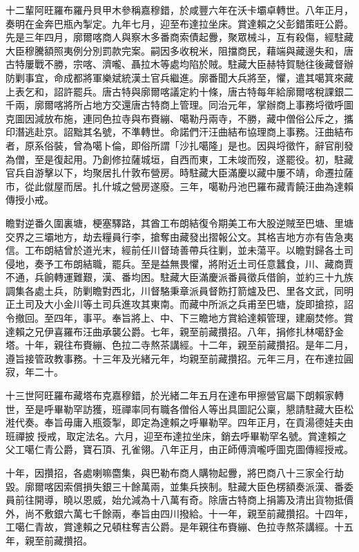 \begin{pinyinscope}
十二輩阿旺羅布羅丹貝甲木參稱嘉穆錯，於咸豐六年在沃卡壩卓轉世。八年正月，奏明在金奔巴瓶內掣定。九年七月，迎至布達拉坐床。賞達賴之父彭錯策旺公爵。先是三年四月，廓爾喀商人與察木多番商索債起釁，聚眾械斗，互有殺傷，經駐藏大臣穆騰額照夷例分別罰款完案。嗣因多收稅米，阻擋商民，藉端與藏邊失和，唐古特屢戰不勝，宗喀、濟嚨、聶拉木等處均陷於賊。駐藏大臣赫特賀馳往後藏督辦防剿事宜，命成都將軍樂斌統漢土官兵繼進。廓番聞大兵將至，懼，遣其噶箕來藏上表乞和，詔許罷兵。唐古特與廓爾喀議定約十條，唐古特每年給廓爾喀稅課銀二千兩，廓爾喀將所占地方交還唐古特商上管理。同治元年，掌辦商上事務埒徵呼圖克圖因減放布施，連同色拉寺與布賚繃、噶勒丹兩寺，不勝，藏中僧俗公斥之，攜印潛逃赴京。詔黜其名號，不準轉世。命諾們汗汪曲結布協理商上事務。汪曲結布者，原系俗裝，曾為噶卜倫，即俗所謂「沙扎噶隆」是也。因與埒徵忤，辭官削發為僧，至是復起用。乃創修拉薩城垣，自西而東，工未竣而歿，遂罷役。初，駐藏官兵自游擊以下，均聚居扎什敦布營房。時駐藏大臣滿慶以藏中屢不靖，命遷拉薩市，從此僦屋而居。扎什城之營房遂廢。三年，噶勒丹池巴羅布藏青饒汪曲為達賴傳授小戒。

瞻對逆番久圍裏塘，梗塞驛路，其酋工布朗結復令期美工布大股逆賊至巴塘、里塘交界之三壩地方，劫去糧員行李，搶奪由藏發出摺報公文。其格吉地方亦有告急夷信。工布朗結曾於道光末，經前任川督琦善帶兵往剿，並未蕩平。以瞻對歸各土司侵地，奏予工布朗結職，罷兵。至是益無畏懼，將附近土司任意蠶食，川、藏商賈不通，兵餉轉運難艱，漢、番均困。駐藏大臣滿慶派番員徵兵借餉，並約三十九族調集各處土兵，防剿瞻對西北，川督駱秉章派員督飭打箭爐及巴、里各文武，同明正土司及大小金川等土司兵進攻其東南。而藏中所派之兵甫至巴塘，旋即搶掠，詔令撤回。至四年，事平。奉旨將上、中、下三瞻地方賞給達賴管理，建廟焚修。賞達賴之兄伊喜羅布汪曲承襲公爵。七年，親至前藏攢招。八年，捐修扎林噶舒金塔。十年，親往布賚繃、色拉二寺熬茶講經。十二年，親至前藏攢招。是年二月，遵旨接管政教事務。十三年及光緒元年，均親至前藏攢招。元年三月，在布達拉圓寂，年二十。

十三世阿旺羅布藏塔布克嘉穆錯，於光緒二年五月在達布甲擦營官屬下朗賴家轉世，至是呼畢勒罕訪獲，班禪率同有職各僧俗人等出具圖記公稟，懇請駐藏大臣松溎代奏。奉旨毋庸入瓶簽掣，即定為達賴之呼畢勒罕。四年正月，在貢湯德娃夫由班禪披授戒，取定法名。六月，迎至布達拉坐床，銷去呼畢勒罕名號。賞達賴之父工噶仁青公爵，寶石頂、孔雀翎。八年正月，由正師傅濟嚨呼圖克圖傳經授戒。

十年，因攢招，各處喇嘛麕集，與巴勒布商人購物起釁，將巴商八十三家全行劫毀。廓爾喀因索償損失銀三十餘萬兩，並集兵挾制。駐藏大臣色楞額奏派漢、番委員前往開導，曉以恩威，始允減為十八萬有奇。除唐古特商上捐籌及清出貨物抵價外，尚不敷銀六萬七千餘兩，奉旨由四川撥給。十一年，親至前藏攢招。十四年，工噶仁青故，賞達賴之兄頓柱奪吉公爵。是年親往布賚繃、色拉寺熬茶講經。十五年，親至前藏攢招。


\end{pinyinscope}
